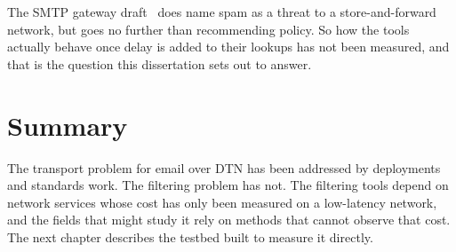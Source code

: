 The SMTP gateway draft~\cite{johnson-dtn-interplanetary-smtp-01} does name spam as a threat to a store-and-forward network, but goes no further than recommending policy. So how the tools actually behave once delay is added to their lookups has not been measured, and that is the question this dissertation sets out to answer.

\section{Summary}

The transport problem for email over DTN has been addressed by deployments and standards work. The filtering problem has not. The filtering tools depend on network services whose cost has only been measured on a low-latency network, and the fields that might study it rely on methods that cannot observe that cost. The next chapter describes the testbed built to measure it directly.



